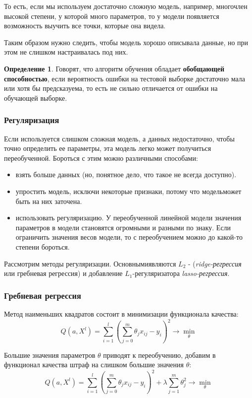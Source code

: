 \documentclass[aps,%
12pt,%
final,%
oneside,
onecolumn,%
musixtex, %
superscriptaddress,%
centertags]{article} %
\theoremstyle{plain}
\theoremstyle{definition}
\newtheorem{definition}{Определение}[subsection]
\theoremstyle{remark}
\begin{document}
То есть, если мы используем достаточно сложную модель, например, многочлен высокой степени, у которой много параметров, то у модели появляется возможность выучить все точки, которые она видела.

Таким образом нужно следить, чтобы модель хорошо описывала данные, но при этом не слишком настраивалась под них.

\begin{definition}
	Говорят, что алгоритм обучения обладает \textbf{обобщающей способностью}, если вероятность ошибки на тестовой выборке достаточно мала или хотя бы предсказуема, то есть не сильно отличается от ошибки на обучающей выборке.
\end{definition}
\newpage

\subsubsection{Регуляризация}

Если используется слишком сложная модель, а данных недостаточно, чтобы точно
определить ее параметры, эта модель легко может получиться переобученной. Бороться
с этим можно различными способами:

\begin{itemize}
	\item взять больше данных (но, понятное дело, что такое не всегда доступно).
	\item упростить модель, исключи некоторые признаки, потому что модельможет быть на них заточена.
	\item использовать регуляризацию. У переобученной линейной модели значения параметров в модели становятся огромными и разными по знаку. Если ограничить значения весов модели, то с переобучением можно до какой-то степени бороться.
\end{itemize}

Рассмотрим методы регуляризации. Основнымиявляются $L_2$ - (\textit{ridge-регрессия} или гребневая регрессия) и добавление $L_1$-регуляризатора \textit{lasso-регрессия}.

\subsubsection{Гребневая регрессия}

Метод наименьших квадратов состоит в минимизации функционала качества:
$$Q(a,X^l) = \sum\limits_{i=1}^l \left(\sum\limits_{j=0}^m \theta_jx_{ij}-y_i\right)^2 \to \underset{\theta}{\min}$$

Большие значения параметров $\theta$ приводят к переобучению, добавим в функционал качества штраф на слишком большие значения $\theta$:
$$Q(a,X^l) = \sum\limits_{i=1}^l \left(\sum\limits_{j=0}^m \theta_jx_{ij}-y_i\right)^2 + \lambda \sum\limits_{j=1}^m \theta_j^2 \to \underset{\theta}{\min}$$
\end{document}
